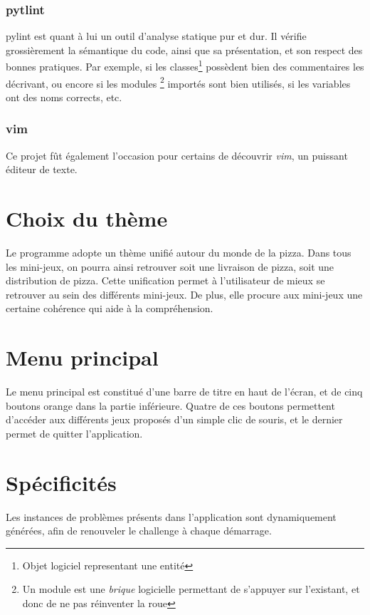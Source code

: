         \subsubsection{pytlint} pylint est quant à lui un outil d'analyse
            statique pur et dur. Il vérifie grossièrement la sémantique du code,
            ainsi que sa présentation, et son respect des bonnes pratiques.
            Par exemple, si les classes\footnote{Objet logiciel representant une entité}
            possèdent bien des commentaires les décrivant, ou encore si les modules
            \footnote{Un module est une \emph{brique} logicielle permettant
            de s'appuyer sur l'existant, et donc de ne pas réinventer la roue}
            importés sont bien utilisés, si les variables ont des noms corrects, etc.
        \subsubsection{vim}
            Ce projet fût également l'occasion pour certains de découvrir \emph{vim},
            un puissant éditeur de texte.

\section{Choix du thème}
    Le programme adopte un thème unifié autour du monde de la pizza. Dans tous les mini-jeux, on pourra
    ainsi retrouver soit une livraison de pizza, soit une distribution de pizza. Cette unification permet à
    l'utilisateur de mieux se retrouver au sein des différents mini-jeux. De plus, elle procure aux mini-jeux
    une certaine cohérence qui aide à la compréhension.

\section{Menu principal}
	Le menu principal est constitué d'une barre de titre en haut de l'écran, et de cinq boutons orange
	 dans la partie inférieure. Quatre de ces boutons permettent d'accéder aux différents jeux proposés
	 d'un simple clic de souris, et le dernier permet de quitter l'application.

\section{Spécificités} %
    Les instances de problèmes présents dans l'application
    sont dynamiquement générées, afin de renouveler
    le challenge à chaque démarrage.
